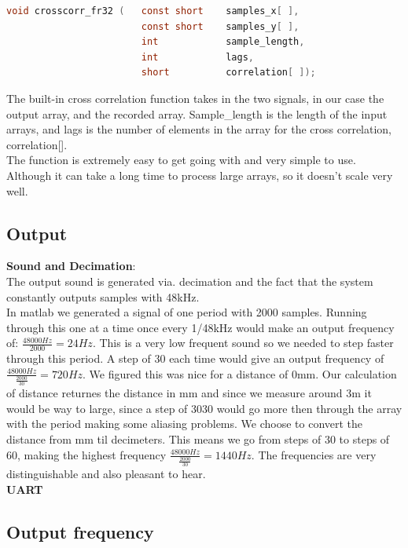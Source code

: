 \begin{lstlisting}[language=C]
void crosscorr_fr32 (	const short    samples_x[ ], 
                     	const short    samples_y[ ],
                     	int            sample_length,
                     	int            lags,
                     	short          correlation[ ]);
\end{lstlisting}
The built-in cross correlation function takes in the two signals, in our case the output array, and the recorded array. Sample\_length is the length of the input arrays, and lags is the number of elements in the array for the cross correlation, correlation[].\\
The function is extremely easy to get going with and very simple to use. Although it can take a long time to process large arrays, so it doesn't scale very well.\\
\subsection{Output}
\textbf{Sound and Decimation}:\\
The output sound is generated via. decimation and the fact that the system constantly outputs samples with 48kHz.\\
In matlab we generated a signal of one period with 2000 samples. Running through this one at a time once every 1/48kHz would make an output frequency of: $\frac{48000Hz}{2000}=24Hz$. This is a very low frequent sound so we needed to step faster through this period. A step of 30 each time would give an output frequency of $\frac{48000Hz}{\frac{2000}{30}}=720Hz$. We figured this was nice for a distance of 0mm. Our calculation of distance returnes the distance in mm and since we measure around 3m it would be way to large, since a step of 3030 would go more then through the array with the period making some aliasing problems. We choose to convert the distance from mm til decimeters. This means we go from steps of 30 to steps of 60, making the highest frequency $\frac{48000Hz}{\frac{2000}{30}}=1440Hz$. The frequencies are very distinguishable and also pleasant to hear.\\
\textbf{UART}\\
\subsection{Output frequency}

